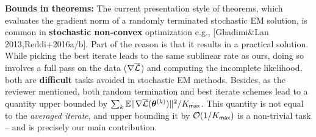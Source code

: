 \documentclass{article}
\begin{document}



\textbf{Bounds in theorems:} 
The current presentation style of theorems, which evaluates the gradient norm of a randomly terminated stochastic EM solution, is common in \textbf{stochastic non-convex} optimization e.g., [Ghadimi\&Lan 2013,Reddi+2016a/b]. Part of the reason is that it results in a practical solution. 
While picking the best iterate leads to the same sublinear rate as ours, doing so  involves a full pass on the data ($\nabla \overline{\cal L}$) and computing the incomplete likelihood, both are \textbf{difficult} tasks avoided in stochastic EM methods. 
Besides, as the reviewer mentioned, both random termination and best iterate schemes lead to a quantity upper bounded by $\sum_k \mathbb{E} \| \nabla \overline{\cal L}( \bm{\theta}^{(k)} )\|^2 / K_{\sf max}$. This quantity is not equal to the \emph{averaged iterate}, and upper bounding it by ${\cal O}(1/K_{\sf max})$ is a non-trivial task -- and is precisely our main contribution.






\end{document}
